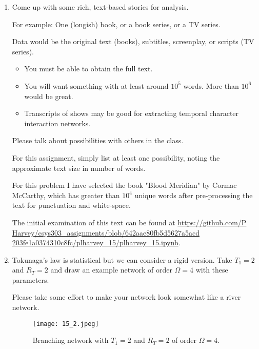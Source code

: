 \begin{enumerate}
  
\item
  
  Come up with some rich, text-based stories for analysis.

  For example: One (longish) book, or a book series, or a TV series.

  Data would be the original text (books), subtitles, screenplay, or scripts (TV series).

  \begin{itemize}
  \item 
    You must be able to obtain the full text.
  \item 
    You will want something with at least around $10^{5}$ words.
    More than $10^{6}$ would be great.
  \item 
    Transcripts of shows may be good for extracting
    temporal character interaction networks.
  \end{itemize}

  Please talk about possibilities with others in the class.
  
  For this assignment, simply list at least one possibility, noting the approximate text size
  in number of words.

  \solutionstart
  
  For this problem I have selected the book "Blood  Meridian" by Cormac McCarthy\cite{mccarthy_1985}, which has greater than $10^4$ unique words after pre-processing the text for punctuation and white-space.
  
  The initial examination of this text can be found at  \url{https://github.com/P  Harvey/csys303_assignments/blob/642aae80fb5d5627a5acd  203fe1a0374310c8fc/plharvey_15/plharvey_15.ipynb}.
  
  \solutionend

\item   
  Tokunaga's law is statistical but we can consider
  a rigid version.  Take $T_1 = 2$ and $R_T = 2$ and
  draw an example network of order $\Omega=4$ with these parameters.

  Please take some effort to make your network look somewhat like a river network.

   \solutionstart
   \begin{figure}[!htpb]
       \centering
       \texttt{[image: 15\_2.jpeg]}
       \caption{Branching network with $T_1 = 2$ and $R_T = 2$ of order $\Omega=4$.}
       \label{fig:15_2}
   \end{figure}
   \solutionend


\end{enumerate}
